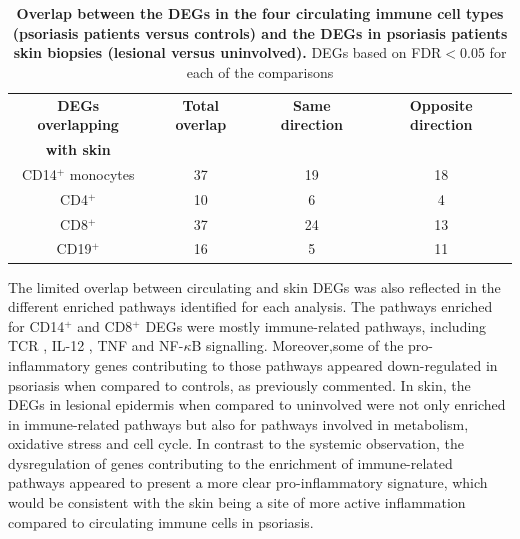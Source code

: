  

\begin{table}[htbp]
\centering
\begin{tabular}{@{} c c c c}
\toprule
\textbf{DEGs overlapping}   & \textbf{Total overlap}   & \textbf{Same direction}  & \textbf{Opposite direction}\\
\textbf{with skin}          &                          &                          &                            \\
\midrule 
\midrule
CD14$^+$ monocytes          & 37                       & 19                       &  18                         \\ 
CD4$^+$                     & 10                       & 6                        &  4                           \\
CD8$^+$                     & 37                       & 24                       &  13                           \\
CD19$^+$                    & 16                       & 5                        &  11                          \\
\bottomrule 
\end{tabular}
\medskip %
\caption[Overlap between the DEGs in the four circulating immune cell types (psoriasis patients versus controls) and the DEGs in psoriasis patients skin biopsies (lesional versus uninvolved).]{\textbf{Overlap between the DEGs in the four circulating immune cell types (psoriasis patients versus controls) and the DEGs in psoriasis patients skin biopsies (lesional versus uninvolved).} DEGs based on FDR$<$0.05 for each of the comparisons} 
\label{tab:RNAseq_overlap_circulating_versus_skin}
\end{table}
\bigskip %


The limited overlap between circulating and skin DEGs was also reflected in the different enriched pathways identified for each analysis. The pathways enriched for CD14$^+$ and CD8$^+$ DEGs were mostly immune-related pathways, including TCR , IL-12 , TNF and NF-$\kappa$B signalling. Moreover,some of the pro-inflammatory genes contributing to those pathways appeared down-regulated in psoriasis when compared to controls, as previously commented.%
In skin, the DEGs in lesional epidermis when compared to uninvolved were not only enriched in immune-related pathways but also for pathways involved in metabolism, oxidative stress and cell cycle. In contrast to the systemic observation, the dysregulation of genes contributing to the enrichment of immune-related pathways appeared to present a more clear pro-inflammatory signature, which would be consistent with the skin being a site of more active inflammation compared to circulating immune cells in psoriasis.


